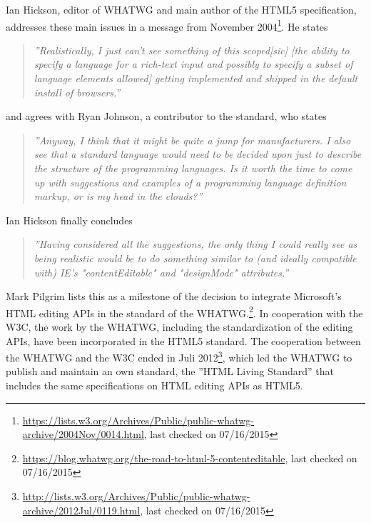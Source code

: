 
Ian Hickson, editor of WHATWG and main author of the HTML5 specification, addresses these main issues in a message from November 2004\footnote{\url{https://lists.w3.org/Archives/Public/public-whatwg-archive/2004Nov/0014.html}, last checked on 07/16/2015}. He states

\begin{quotation}
\textit{''Realistically, I just can't see something of this scoped[sic] [the ability to specify a language for a rich-text input and possibly to specify a subset of language elements allowed] getting implemented and shipped in the default install of browsers.''}
\end{quotation}

and agrees with Ryan Johnson, a contributor to the standard, who states

\begin{quotation}
\textit{''Anyway, I think that it might be quite a jump for manufacturers. I also see that a standard language would need to be decided upon just to describe the structure of the programming languages. Is it worth the time to come up with suggestions and examples of a programming language definition markup, or is my head in the clouds?''}
\end{quotation}

Ian Hickson finally concludes

\begin{quotation}
\textit{''Having considered all the suggestions, the only thing I could really see 
as being realistic would be to do something similar to (and ideally 
compatible with) IE's "contentEditable" and "designMode" attributes.''}
\end{quotation}

Mark Pilgrim lists this as a milestone of the decision to integrate Microsoft's HTML editing APIs in the standard of the WHATWG.\footnote{\url{https://blog.whatwg.org/the-road-to-html-5-contenteditable}, last checked on 07/16/2015}. In cooperation with the W3C, the work by the WHATWG, including the standardization of the editing APIs, have been incorporated in the HTML5 standard. The cooperation between the WHATWG and the W3C ended in Juli 2012\footnote{\url{http://lists.w3.org/Archives/Public/public-whatwg-archive/2012Jul/0119.html}, last checked on 07/16/2015}, which led the WHATWG to publish and maintain an own standard, the ''HTML Living Standard'' \cite{HTMLWHATWG} that includes the same specifications on HTML editing APIs as HTML5.




